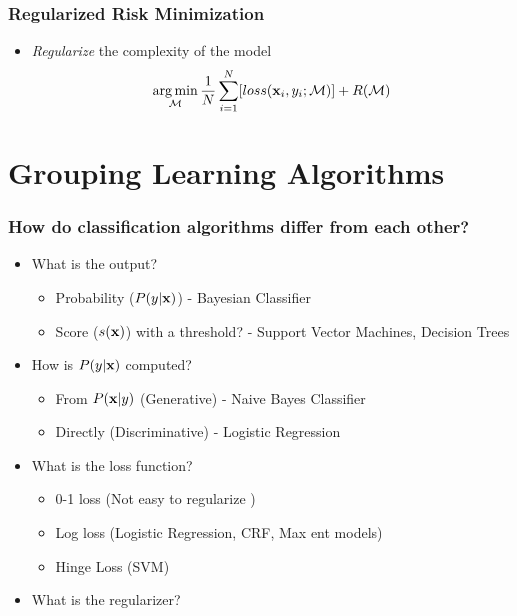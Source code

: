 \documentclass[10pt]{beamer}
\DeclareMathOperator*{\argmin}{arg\,min}
\begin{document}
\begin{frame}
\frametitle{Regularized Risk Minimization}
\begin{itemize}
\item {\em Regularize} the complexity of the model
  \[
  \argmin_{\mathcal{M}} \frac{1}{N}\sum_{i=1}^N[loss({\bf x}_i,y_i;\mathcal{M})] + R(\mathcal{M})
  \]
\end{itemize}
\end{frame}
\section{Grouping Learning Algorithms}
\begin{frame}
\frametitle{How do classification algorithms differ from each other?}
\begin{itemize}
  \item What is the output?
    \begin{itemize}
    \item Probability ($P(y|{\bf x})$) - Bayesian Classifier
    \item Score ($s({\bf x})$) with a threshold? - Support Vector Machines, Decision Trees
    \end{itemize}
  \item How is $P(y|{\bf x})$ computed?
    \begin{itemize}
      \item From $P({\bf x}|y)$ (Generative) - Naive Bayes Classifier
      \item Directly (Discriminative) - Logistic Regression
    \end{itemize}
  \item What is the loss function?
    \begin{itemize}
    \item 0-1 loss (Not easy to regularize \frownie{})
    \item Log loss (Logistic Regression, CRF, Max ent models)
    \item Hinge Loss (SVM)
    \end{itemize}
  \item What is the regularizer?
\end{itemize}
\end{frame}
\end{document}
